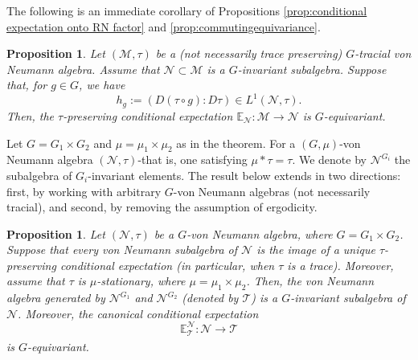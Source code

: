 \documentclass[12pt]{amsart}
\newcommand{\cM}{{\mathcal M}}
\newcommand{\cN}{{\mathcal N}}
\newtheorem{proposition}[thm]{Proposition}
\theoremstyle{definition}
\begin{document}
The following is an immediate corollary of Propositions \ref{prop:conditional expectation onto RN factor} and \ref{prop:commutingequivariance}.
\begin{proposition}
Let $(\cM,\tau)$ be a (not necessarily trace preserving) $G$-tracial von Neumann algebra. Assume that $\mathcal{N}\subset\mathcal{M}$ is a $G$-invariant subalgebra. Suppose that, for $g\in G$, we have
$$h_g:=(D(\tau\circ g):D\tau)\in L^1(\cN,\tau).$$ Then, the $\tau$-preserving conditional expectation $\mathbb{E}_{\mathcal{N}}:\mathcal{M}\to\mathcal{N}$ is $G$-equivariant.    
\end{proposition}


Let $G=G_1\times G_2$ and $\mu=\mu_1\times \mu_2$ as in the theorem. For a $(G,\mu)$-von Neumann algebra $(\cN,\tau)$-that is, one satisfying $\mu*\tau=\tau$. We denote by $\cN^{G_i}$ the subalgebra of $G_i$-invariant elements. The result below extends \cite[Proposition~1.10]{BS06} in two directions: first, by working with arbitrary $G$-von Neumann algebras (not necessarily tracial), and second, by removing the assumption of ergodicity.
\begin{proposition}\label{prop: =key ingredient in the introduction}
Let $(\mathcal{N},\tau)$ be a $G$-von Neumann algebra, where $G=G_1\times G_2$. Suppose that every von Neumann subalgebra of $\cN$ is the image of a unique $\tau$-preserving conditional expectation (in particular, when $\tau$ is a trace). Moreover, assume that $\tau$ is $\mu$-stationary, where $\mu=\mu_1\times\mu_2$. Then, the von Neumann algebra generated by $\mathcal{N}^{G_1}$ and $\mathcal{N}^{G_2}$ (denoted by $\mathcal{T}$) is a $G$-invariant subalgebra of $\mathcal{N}$. Moreover, the canonical conditional expectation  
\[\mathbb{E}_{\mathcal{T}}^{\cN}:\mathcal{N}\xrightarrow[]{} \mathcal{T}\]
is $G$-equivariant.
\end{proposition}
\end{document}
